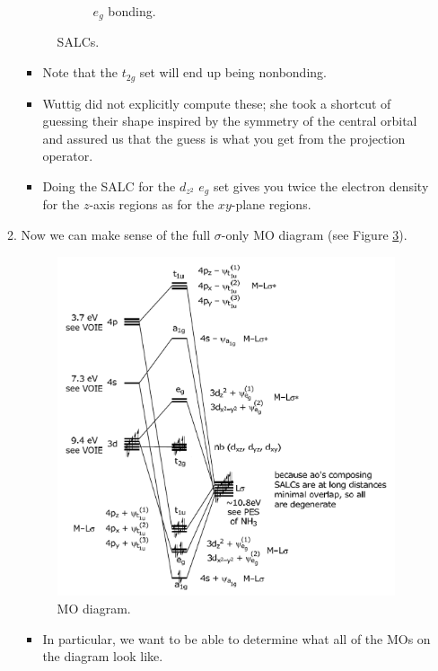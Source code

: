 \documentclass[../notes.tex]{subfiles}
\begin{document}
\begin{itemize}
\begin{enumerate}
\begin{figure}[h!]
\begin{subfigure}[b]{0.24\linewidth}
                \caption{$e_g$ bonding.}
                \label{fig:SALCML6d}
            \end{subfigure}
            \caption{ SALCs.}
            \label{fig:SALCML6}
        \end{figure}
        \begin{itemize}
            \item Note that the $t_{2g}$ set will end up being nonbonding.
            \item Wuttig did not explicitly compute these; she took a shortcut of guessing their shape inspired by the symmetry of the central orbital and assured us that the guess is what you get from the projection operator.
            \item Doing the SALC for the $d_{z^2}$ $e_g$ set gives you twice the electron density for the $z$-axis regions as for the $xy$-plane regions.
        \end{itemize}
        \item Now we can make sense of the full $\sigma$-only MO diagram (see Figure \ref{fig:MOsML6}).
        \begin{figure}[h!]
            \centering
            \includegraphics[width=0.6\linewidth]{../ExtFiles/MOsML6.png}
            \caption{ MO diagram.}
            \label{fig:MOsML6}
        \end{figure}
        \begin{itemize}
            \item In particular, we want to be able to determine what all of the MOs on the diagram look like.
        \end{itemize}
    \end{enumerate}

\end{itemize}
\end{document}
